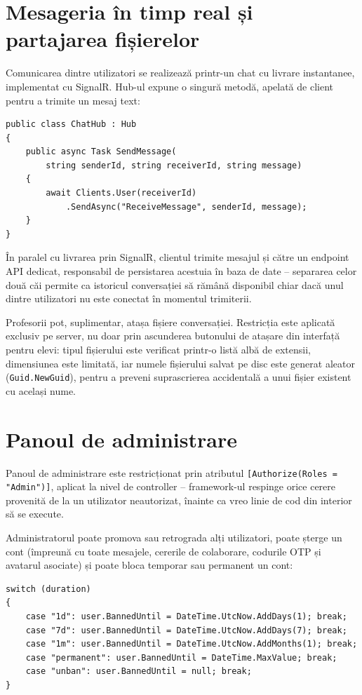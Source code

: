 \section{Mesageria în timp real și partajarea fișierelor}

Comunicarea dintre utilizatori se realizează printr-un chat cu livrare
instantanee, implementat cu SignalR. Hub-ul expune o singură metodă, apelată de
client pentru a trimite un mesaj text:

\begin{lstlisting}[caption={ChatHub -- livrarea mesajelor în timp real}]
public class ChatHub : Hub
{
    public async Task SendMessage(
        string senderId, string receiverId, string message)
    {
        await Clients.User(receiverId)
            .SendAsync("ReceiveMessage", senderId, message);
    }
}
\end{lstlisting}

În paralel cu livrarea prin SignalR, clientul trimite mesajul și către un
endpoint API dedicat, responsabil de persistarea acestuia în baza de date --
separarea celor două căi permite ca istoricul conversației să rămână disponibil
chiar dacă unul dintre utilizatori nu este conectat în momentul trimiterii.

Profesorii pot, suplimentar, atașa fișiere conversației. Restricția este aplicată
exclusiv pe server, nu doar prin ascunderea butonului de atașare din interfață
pentru elevi: tipul fișierului este verificat printr-o listă albă de extensii,
dimensiunea este limitată, iar numele fișierului salvat pe disc este generat
aleator (\texttt{Guid.NewGuid}), pentru a preveni suprascrierea accidentală a
unui fișier existent cu același nume.

\section{Panoul de administrare}

Panoul de administrare este restricționat prin atributul
\texttt{[Authorize(Roles = "Admin")]}, aplicat la nivel de controller -- framework-ul
respinge orice cerere provenită de la un utilizator neautorizat, înainte ca vreo
linie de cod din interior să se execute.

Administratorul poate promova sau retrograda alți utilizatori, poate șterge un
cont (împreună cu toate mesajele, cererile de colaborare, codurile OTP și avatarul
asociate) și poate bloca temporar sau permanent un cont:

\begin{lstlisting}[caption={Aplicarea unei blocări (fragment din AdminController)}]
switch (duration)
{
    case "1d": user.BannedUntil = DateTime.UtcNow.AddDays(1); break;
    case "7d": user.BannedUntil = DateTime.UtcNow.AddDays(7); break;
    case "1m": user.BannedUntil = DateTime.UtcNow.AddMonths(1); break;
    case "permanent": user.BannedUntil = DateTime.MaxValue; break;
    case "unban": user.BannedUntil = null; break;
}
\end{lstlisting}

